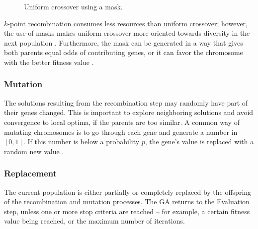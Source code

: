     \begin{figure}[ht]
        \centering
        \caption{Uniform crossover using a mask.}
        \label{fig:uniform crossover}
    \end{figure}

    $k$-point recombination consumes less resources than uniform crossover; however, the use of masks makes uniform crossover more oriented towards diversity in the next population \cite{KATOCH2021}. Furthermore, the mask can be generated in a way that gives both parents equal odds of contributing genes, or it can favor the chromosome with the better fitness value \cite{SASTRY2005}.

 \subsubsection*{Mutation}
 
    The solutions resulting from the recombination step may randomly have part of their genes changed. This is important to explore neighboring solutions and avoid convergence to local optima, if the parents are too similar. A common way of mutating chromosomes is to go through each gene and generate a number in $[0,1]$. If this number is below a probability $p$, the gene's value is replaced with a random new value \cite{SONI2014}.

\subsubsection*{Replacement}
    
    The current population is either partially or completely replaced by the offspring of the recombination and mutation processes. The GA returns to the Evaluation step, unless one or more stop criteria are reached -- for example, a certain fitness value being reached, or the maximum number of iterations.